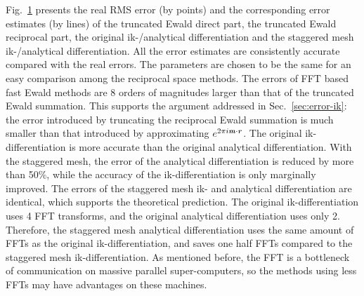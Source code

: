 \documentclass[aps,pre,preprint,unsortedaddress]{revtex4}
\newcommand{\redc}[1]{{\color{red} #1}}
\renewcommand{\v}[1]{\textbf{\textit{#1}}}
\begin{document}
\begin{figure}
  \label{fig:error1}
\end{figure}

Fig.~\ref{fig:error1} presents the real RMS error (by points) and the
corresponding error estimates (by lines) of the \redc{truncated} Ewald direct
part, the truncated Ewald reciprocal part, the original ik-/analytical
differentiation and the staggered mesh ik-/analytical
differentiation. All the error estimates \redc{are consistently accurate compared with}
the real errors.  The parameters are
chosen to be the same for an easy comparison among the
reciprocal space methods.  The errors of FFT
based fast Ewald methods are 8 orders of magnitudes larger than that of
the truncated Ewald summation.
This supports the argument addressed in
Sec.~\ref{sec:error-ik}: the error introduced by truncating the
reciprocal Ewald summation is much smaller than that introduced by
approximating $e^{2\pi i\v m\cdot\v r}$.
The original ik-differentiation is more accurate than
the original analytical differentiation.
With the staggered mesh,
the error of the analytical differentiation \redc{is reduced} by more than 50\%,
while the accuracy of the ik-differentiation is only marginally
improved.
The errors of the staggered mesh ik- and analytical differentiation
are identical, which supports the theoretical prediction.
The original ik-differentiation uses 4
FFT transforms, and the original analytical differentiation uses
only 2.  Therefore, the staggered mesh analytical differentiation uses
the same amount of FFTs as the original ik-differentiation, and saves
one half FFTs \redc{compared to} the staggered mesh ik-differentiation.  As mentioned before,
the FFT is a bottleneck of communication on massive parallel
super-computers,
so the methods using less FFTs may have advantages on these machines.
\end{document}
